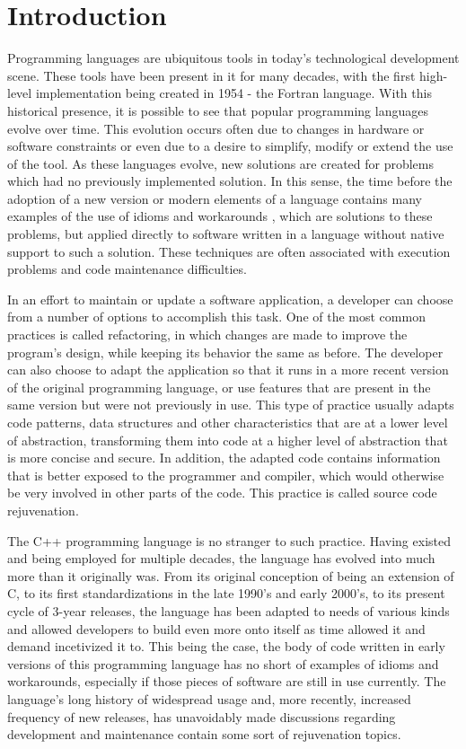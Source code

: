 \section{Introduction}
Programming languages are ubiquitous tools in today's technological development scene. These tools have been present in it for many decades, with the first high-level implementation being created in 1954 - the Fortran language. \cite{howlett1980history} With this historical presence, it is possible to see that popular programming languages evolve over time. \cite{pirkelbauer2010source} This evolution occurs often due to changes in hardware or software constraints or even due to a desire to simplify, modify or extend the use of the tool. As these languages evolve, new solutions are created for problems which had no previously implemented solution. In this sense, the time before the adoption of a new version or modern elements of a language contains many examples of the use of idioms and workarounds \cite{pirkelbauer2010source}, which are solutions to these problems, but applied directly to software written in a language without native support to such a solution. These techniques are often associated with execution problems and code maintenance difficulties. \cite{pirkelbauer2010source}

In an effort to maintain or update a software application, a developer can choose from a number of options to accomplish this task. One of the most common practices is called refactoring, in which changes are made to improve the program's design, while keeping its behavior the same as before. \cite{pirkelbauer2010source} The developer can also choose to adapt the application so that it runs in a more recent version of the original programming language, or use features that are present in the same version but were not previously in use. This type of practice usually adapts code patterns, data structures and other characteristics that are at a lower level of abstraction, transforming them into code at a higher level of abstraction that is more concise and secure. \cite{pirkelbauer2010source} In addition, the adapted code contains information that is better exposed to the programmer and compiler, which would otherwise be very involved in other parts of the code. \cite{pirkelbauer2010source} This practice is called source code rejuvenation.

The C++ programming language is no stranger to such practice. Having existed and being employed for multiple decades, the language has evolved into much more than it originally was. From its original conception of being an extension of C, to its first standardizations in the late 1990's and early 2000's, to its present cycle of 3-year releases, the language has been adapted to needs of various kinds and allowed developers to build even more onto itself as time allowed it and demand incetivized it to. This being the case, the body of code written in early versions of this programming language has no short of examples of idioms and workarounds, especially if those pieces of software are still in use currently. The language's long history of widespread usage and, more recently, increased frequency of new releases, has unavoidably made discussions regarding development and maintenance contain some sort of rejuvenation topics.

